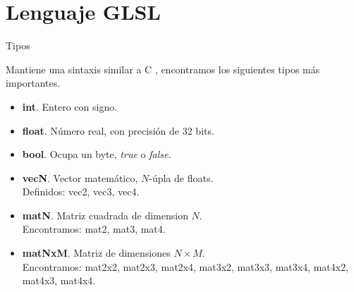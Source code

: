 \section{Lenguaje GLSL}

\SectionPage

\begin{frame}{Tipos}
    
    Mantiene una sintaxis similar a C \cite{glslang:2020}, encontramos los siguientes tipos más importantes.
    \vfill
    
    \begin{itemize}
        \item \textbf{int}. Entero con signo.
        \item \textbf{float}. Número real, con precisión de 32 bits.
        \item \textbf{bool}. Ocupa un byte, \textit{true} o \textit{false}.
        \item \textbf{vecN}. Vector matemático, \(N\)-úpla de floats.\\Definidos: vec2, vec3, vec4.
        \item \textbf{matN}. Matriz cuadrada de dimension \(N\).\\Encontramos: mat2, mat3, mat4.
        \item \textbf{matNxM}. Matriz de dimensiones \(N\times M\).\\Encontramos: mat2x2, mat2x3, mat2x4, mat3x2, mat3x3, mat3x4, mat4x2, mat4x3, mat4x4.
    \end{itemize}
    
\end{frame}

